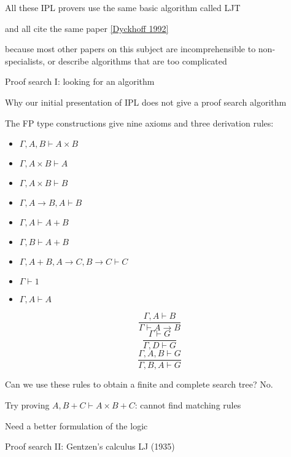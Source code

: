 All these IPL provers use the same basic algorithm called LJT 

and all cite the same paper {\footnotesize{}\href{https://rd.host.cs.st-andrews.ac.uk/publications/jsl57.pdf}{[Dyckhoff 1992]}}{\footnotesize\par}

because most other papers on this subject are incomprehensible to
non-specialists, or describe algorithms that are too complicated

Proof search I: looking for an algorithm

Why our initial presentation of IPL does not give a proof search algorithm

The FP type constructions give nine axioms and three derivation rules:

\begin{minipage}[t]{0.49\columnwidth}%
\begin{itemize}
\item $\Gamma,A,B\vdash A\times B$ 
\item $\Gamma,A\times B\vdash A$ 
\item $\Gamma,A\times B\vdash B$
\item $\Gamma,A\rightarrow B,A\vdash B$
\item $\Gamma,A\vdash A+B$ 
\item $\Gamma,B\vdash A+B$
\item $\Gamma,A+B,A\rightarrow C,B\rightarrow C\vdash C$
\item $\Gamma\vdash1$
\item $\Gamma,A\vdash A$
\end{itemize}
%
\end{minipage}%
\begin{minipage}[t]{0.49\columnwidth}%
\[
\frac{\Gamma,A\vdash B}{\Gamma\vdash A\rightarrow B}
\]
\[
\frac{\Gamma\vdash G}{\Gamma,D\vdash G}
\]
\[
\frac{\Gamma,A,B\vdash G}{\Gamma,B,A\vdash G}
\]
%
\end{minipage}

\medskip{}
Can we use these rules to obtain a finite and complete search tree?
No.

Try proving $A,B+C\vdash A\times B+C$: cannot find matching rules

Need a better formulation of the logic

Proof search II: Gentzen\textsf{'}s calculus LJ (1935)

